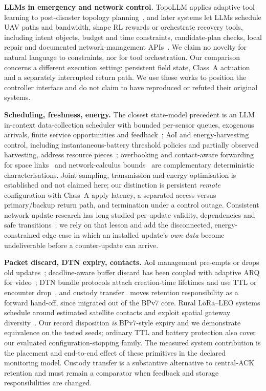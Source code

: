 \documentclass[journal,10pt]{IEEEtran}
\begin{document}
\textbf{LLMs in emergency and network control.} TopoLLM applies adaptive tool learning to
post-disaster topology planning~\cite{topollm}, and later systems let LLMs schedule UAV paths and
bandwidth, shape RL rewards or orchestrate recovery tools, including intent objects, budget and
time constraints, candidate-plan checks, local repair and documented network-management
APIs~\cite{icgrestore,ossgpt}. We claim no novelty for natural language to constraints, nor for
tool orchestration. Our comparison concerns a different execution setting: persistent field state, Class~A
actuation and a separately interrupted return path. We use those works to position the controller
interface and do not claim to have reproduced or refuted their original systems.

\textbf{Scheduling, freshness, energy.} The closest state-model precedent is an LLM in-context
data-collection scheduler with bounded per-sensor queues, exogenous arrivals, finite service
opportunities and feedback~\cite{icldc}; AoI and energy-harvesting control, including
instantaneous-battery threshold policies and partially observed harvesting, address resource
pieces~\cite{bacinoglu1905,zakeri2311,costa2014pm}; overbooking and contact-aware forwarding for
space links~\cite{ccsdssabr} and network-calculus bounds~\cite{leboudec01} are complementary
deterministic characterisations. Joint sampling, transmission and energy optimisation is
established and not claimed here; our distinction is persistent \emph{remote} configuration with
Class~A apply latency, a separated access versus primary/backup return path, and termination under a
control outage. Consistent network update research has long studied per-update validity,
dependencies and safe transitions~\cite{sdnconsistency}; we rely on that lesson and add the
disconnected, energy-constrained edge case in which an installed update's \emph{own data} become
undeliverable before a counter-update can arrive.

\textbf{Packet discard, DTN expiry, contacts.} AoI management pre-empts or drops old
updates~\cite{kam2016deadline,krishnan2019multihop}; deadline-aware buffer discard has been coupled
with adaptive ARQ for video~\cite{razavivideo}; DTN bundle protocols attach creation-time lifetimes
and use TTL or encounter drop~\cite{dtnarch,iranmaneshdtnqueue,rfc9171}, and custody
transfer~\cite{rfc5050} moves retention responsibility as a forward hand-off, since migrated out of
the BPv7 core. Rural LoRa--LEO systems schedule around estimated satellite contacts and exploit
spatial gateway diversity~\cite{sateriot}. Our record disposition \emph{is} BPv7-style expiry and we
demonstrate equivalence on the tested seeds; ordinary TTL and battery protection also cover our evaluated configuration-stopping family.
The measured system contribution is the placement and end-to-end effect of these primitives in
the declared monitoring model. Custody transfer is a substantive alternative to central-ACK
retention and must remain a comparator when feedback and storage responsibilities are changed.
\end{document}
